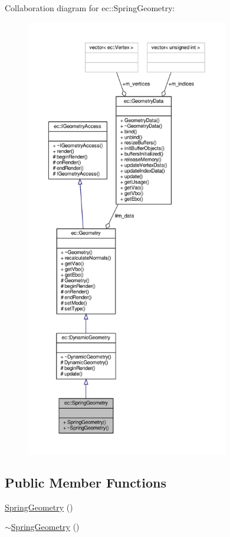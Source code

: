Collaboration diagram for ec\+:\+:Spring\+Geometry\+:\nopagebreak
\begin{figure}[H]
\begin{center}
\leavevmode
\includegraphics[height=550pt]{classec_1_1_spring_geometry__coll__graph}
\end{center}
\end{figure}
\subsection*{Public Member Functions}
\begin{DoxyCompactItemize}
\item 
\mbox{\hyperlink{classec_1_1_spring_geometry_afc2aa4b3e49cc72083f9b3bc1b1d22be}{Spring\+Geometry}} ()
\item 
\mbox{\hyperlink{classec_1_1_spring_geometry_aaf7c2395d3d548c549eb76a10c85a60e}{$\sim$\+Spring\+Geometry}} ()
\end{DoxyCompactItemize}
